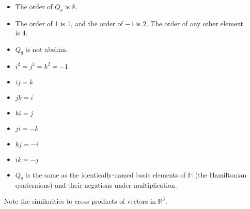 \documentclass{article}
\begin{document}
\begin{itemize}
\begin{itemize}
 \item The order of $Q_8$ is $8$.
 \item The order of 1 is 1, and the order of $-1$ is 2.  The order of any other element is 4.
 \item $Q_8$ is not abelian.
 \item $i^2 = j^2 = k^2 = -1$
 \item $ij = k$
 \item $jk = i$
 \item $ki = j$
 \item $ji = -k$
 \item $kj = -i$
 \item $ik = -j$
 \item $Q_8$ is the same as the identically-named basis elements of $\mathbb{H}$ (the Hamiltonian quaternions) and their negations under multiplication.
 \end{itemize}
 Note the similarities to cross products of vectors in $\mathbb{R}^3$.

\end{itemize}
\end{document}
